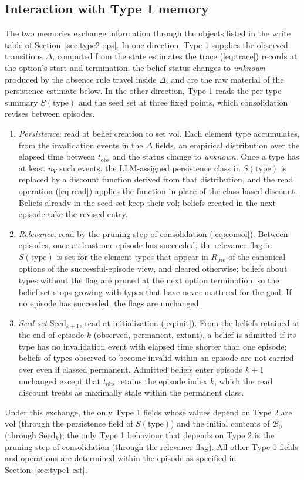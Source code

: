 \documentclass[11pt]{article}
\newcommand{\calB}{\mathcal{B}}
\newcommand{\Rel}{R}
\newcommand{\vol}{\mathrm{vol}}
\newcommand{\type}{\mathrm{type}}
\newcommand{\tobs}{t_{\mathrm{obs}}}
\begin{document}
\subsection{Interaction with Type 1 memory}
\label{sec:type1-type2}

The two memories exchange information through the objects listed in the write table of Section~\ref{sec:type2-ops}. In one direction, Type 1 supplies the observed transitions $\Delta$, computed from the state estimates the trace (\ref{eq:trace}) records at the option's start and termination; the belief status changes to \emph{unknown} produced by the absence rule travel inside $\Delta$, and are the raw material of the persistence estimate below. In the other direction, Type 1 reads the per-type summary $S(\type)$ and the seed set at three fixed points, which consolidation revises between episodes.

\begin{enumerate}[leftmargin=1.5em,itemsep=1pt]
\item \emph{Persistence}, read at belief creation to set $\vol$. Each element type accumulates, from the invalidation events in the $\Delta$ fields, an empirical distribution over the elapsed time between $\tobs$ and the status change to \emph{unknown}. Once a type has at least $n_V$ such events, the LLM-assigned persistence class in $S(\type)$ is replaced by a discount function derived from that distribution, and the read operation (\ref{eq:read}) applies the function in place of the class-based discount. Beliefs already in the seed set keep their $\vol$; beliefs created in the next episode take the revised entry.
\item \emph{Relevance}, read by the pruning step of consolidation (\ref{eq:consol}). Between episodes, once at least one episode has succeeded, the relevance flag in $S(\type)$ is set for the element types that appear in $\Rel_{\mathrm{pre}}$ of the canonical options of the successful-episode view, and cleared otherwise; beliefs about types without the flag are pruned at the next option termination, so the belief set stops growing with types that have never mattered for the goal. If no episode has succeeded, the flags are unchanged.
\item \emph{Seed set} $\mathrm{Seed}_{k+1}$, read at initialization (\ref{eq:init}). From the beliefs retained at the end of episode $k$ (observed, permanent, extant), a belief is admitted if its type has no invalidation event with elapsed time shorter than one episode; beliefs of types observed to become invalid within an episode are not carried over even if classed permanent. Admitted beliefs enter episode $k+1$ unchanged except that $\tobs$ retains the episode index $k$, which the read discount treats as maximally stale within the permanent class.
\end{enumerate}

Under this exchange, the only Type 1 fields whose values depend on Type 2 are $\vol$ (through the persistence field of $S(\type)$) and the initial contents of $\calB_0$ (through $\mathrm{Seed}_k$); the only Type 1 behaviour that depends on Type 2 is the pruning step of consolidation (through the relevance flag). All other Type 1 fields and operations are determined within the episode as specified in Section~\ref{sec:type1-est}.
\end{document}
